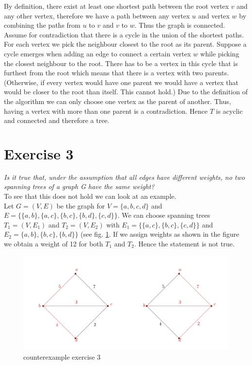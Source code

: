 \documentclass{article}
\begin{document}
By definition, there exist at least one shortest path between the root vertex $v$ and any other vertex, therefore we have a path between any vertex $u$ and vertex $w$ by combining the paths from $u$ to $v$ and $v$ to $w$. Thus the graph is connected.\\ 
Assume for contradiction that there is a cycle in the union of the shortest paths. For each vertex we pick the neighbour closest to the root as its parent. Suppose a cycle emerges when adding an edge to connect a certain vertex $w$ while picking the closest neighbour to the root. There has to be a vertex in this cycle that is furthest from the root which means that there is a vertex with two parents. (Otherwise, if every vertex would have one parent we would have a vertex that would be closer to the root than itself. This cannot hold.) Due to the definition of the algorithm we can only choose one vertex as the parent of another. 
Thus, having a vertex with more than one parent is a contradiction. Hence $T$ is acyclic and connected and therefore a tree.\\

\section*{Exercise 3}

\emph{Is it true that, under the assumption that all edges have different weights, no two spanning trees of a graph G have the same weight?}\\

To see that this does not hold we can look at an example.\\
Let $G=(V,E)$ be the graph for $V = \{a,b,c,d\}$ and $E = \{ \{a,b\}, \{a,c\}, \{b,c\}, \{b,d\}, \{c,d\} \}$. We can choose spanning trees $T_1 = (V, E_1)$ and $T_2 = (V, E_2)$ with $E_1 = \{ \{a,c\}, \{b,c\}, \{c,d\} \}$ and $E_2=\{a,b\}, \{b,c\}, \{b,d\} \}$ (see fig. \ref{ex_3}. If we assign weights as shown in the figure we obtain a weight of 12 for both $T_1$ and $T_2$. Hence the statement is not true.
\begin{figure}[h]
    \centering
    \includegraphics{Ex_3_project.png}
       \caption{counterexample exercise 3}
    \label{ex_3}
\end{figure}
\end{document}
